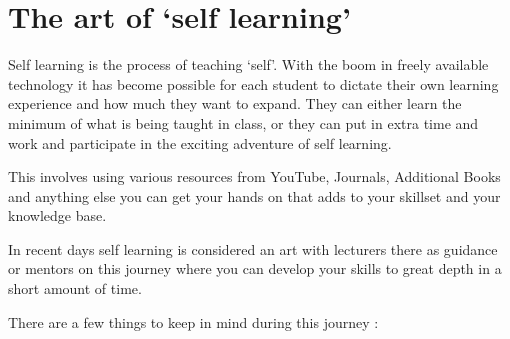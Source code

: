 \documentclass[]{book}
\theoremstyle{definition}
\theoremstyle{definition}
\theoremstyle{remark}
\begin{document}
\section{\texorpdfstring{The art of `self
learning'}{The art of self learning}}\label{the-art-of-self-learning}

Self learning is the process of teaching `self'. With the boom in freely
available technology it has become possible for each student to dictate
their own learning experience and how much they want to expand. They can
either learn the minimum of what is being taught in class, or they can
put in extra time and work and participate in the exciting adventure of
self learning.

This involves using various resources from YouTube, Journals, Additional
Books and anything else you can get your hands on that adds to your
skillset and your knowledge base.

In recent days self learning is considered an art with lecturers there
as guidance or mentors on this journey where you can develop your skills
to great depth in a short amount of time.

There are a few things to keep in mind during this journey :
\end{document}
